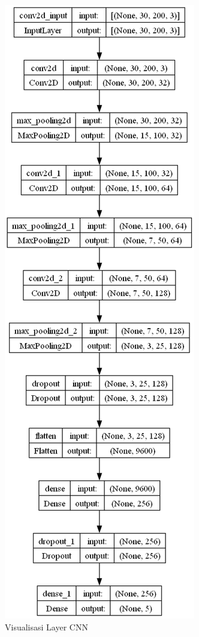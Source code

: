 \begin{figure} [ht] \centering
  \includegraphics[scale=0.38]{gambar/bab3/layer.png}
  \caption{Visualisasi Layer CNN}
  \label{fig:layercnn}
\end{figure}

